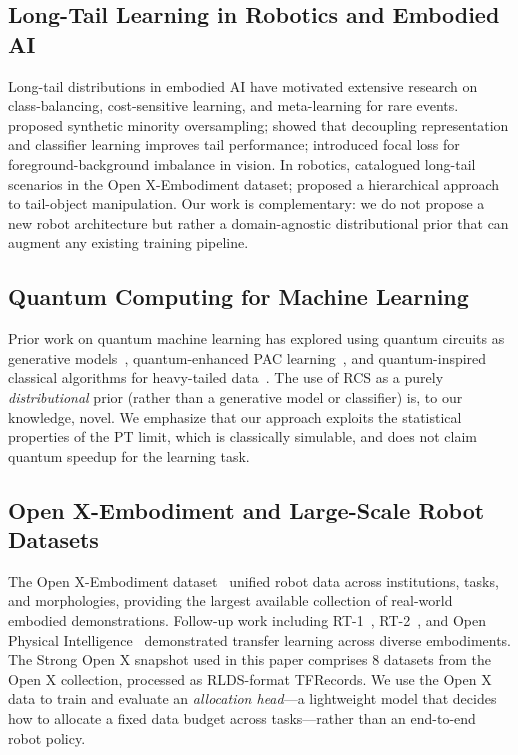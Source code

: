 \documentclass[10pt]{article}
\begin{document}
\subsection{Long-Tail Learning in Robotics and Embodied AI}
Long-tail distributions in embodied AI have motivated extensive research on
class-balancing, cost-sensitive learning, and meta-learning for rare events.
~\citet{chawla2002smote} proposed synthetic minority oversampling; \citet{kang2019decoupling}
showed that decoupling representation and classifier learning improves tail performance;
\citet{lin2017focal} introduced focal loss for foreground-background imbalance in vision.
In robotics, \citet{padalkar2023open} catalogued long-tail scenarios in the Open X-Embodiment
dataset; \citet{yu2023partly} proposed a hierarchical approach to tail-object manipulation.
Our work is complementary: we do not propose a new robot architecture but rather a
domain-agnostic distributional prior that can augment any existing training pipeline.

\subsection{Quantum Computing for Machine Learning}
Prior work on quantum machine learning has explored using quantum circuits as generative
models~\citep{liu2021differentiable,benedetti2019parameterized}, quantum-enhanced PAC
learning~\citep{aaronson2018dequantized}, and quantum-inspired classical algorithms for
heavy-tailed data~\citep{chakrabarti2020quantum}.  The use of RCS as a
purely \emph{distributional} prior (rather than a generative model or classifier) is, to
our knowledge, novel.  We emphasize that our approach exploits the statistical properties
of the PT limit, which is classically simulable, and does not claim quantum speedup for
the learning task.

\subsection{Open X-Embodiment and Large-Scale Robot Datasets}
The Open X-Embodiment dataset~\citep{padalkar2023open} unified robot data across institutions,
tasks, and morphologies, providing the largest available collection of real-world embodied
demonstrations.  Follow-up work including RT-1~\citep{brohan2022rt}, RT-2~\citep{ahn2022can},
and Open Physical Intelligence~\citep{ahmadzadeh2023openpi} demonstrated transfer learning
across diverse embodiments.  The Strong Open X snapshot used in this paper comprises
8 datasets from the Open X collection, processed as RLDS-format TFRecords.  We use the
Open X data to train and evaluate an \emph{allocation head}---a lightweight model that
decides how to allocate a fixed data budget across tasks---rather than an end-to-end
robot policy.
\end{document}
